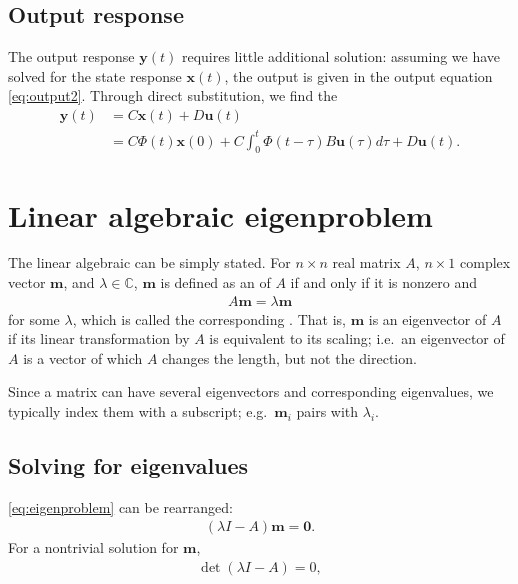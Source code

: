 \documentclass[dynamic_systems.tex]{subfiles}
\begin{document}
\subsection{Output response}
\tags{}

The output response $\bm{y}(t)$ requires little additional solution: assuming we have solved for the state response $\bm{x}(t)$, the output is given in the output equation \autoref{eq:output2}.
Through direct substitution, we find the 
\tags{}
\begin{subequations}\label{eq:output_response}
\begin{align}
	\bm{y}(t) &= C \bm{x}(t) + D \bm{u}(t) \\
	&= C \Phi(t) \bm{x}(0) + C \int_0^t \Phi(t - \tau) B \bm{u}(\tau) d\tau + D \bm{u}(t).
\end{align}
\end{subequations}

\section{Linear algebraic eigenproblem}
\tags{}

The linear algebraic  can be simply stated.
For $n\times n$ real matrix $A$, $n\times 1$ complex vector $\bm{m}$, and $\lambda\in\mathbb{C}$, $\bm{m}$ is defined as an  of $A$ if and only if it is nonzero and 
\begin{align}\label{eq:eigenproblem}
A \bm{m} = \lambda \bm{m}
\end{align}
for some $\lambda$, which is called the corresponding .
That is, $\bm{m}$ is an eigenvector of $A$ if its linear transformation by $A$ is equivalent to its scaling; i.e.\ an eigenvector of $A$ is a vector of which $A$ changes the length, but not the direction.
\tags{}

Since a matrix can have several eigenvectors and corresponding eigenvalues, we typically index them with a subscript; e.g.\ $\bm{m}_i$ pairs with $\lambda_i$.
\tags{}

\subsection{Solving for eigenvalues}
\tags{}

\autoref{eq:eigenproblem} can be rearranged:
\begin{align}\label{eq:eigenproblem2}
	(\lambda I - A) \bm{m} = \bm{0}.
\end{align}
For a nontrivial solution for $\bm{m}$,
\begin{align}
	\det(\lambda I - A) = 0,
\end{align}
\end{document}
